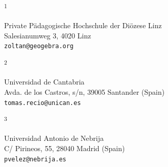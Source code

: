 \documentclass{article}
\newcommand{\ADDRESS}[2]{\noindent
  \textsuperscript{#1}\parbox[t]{0.9\textwidth}{#2} \vspace{6pt}}
\begin{document}
\vspace{1cm}

\ADDRESS{1}{
Private P\"adagogische Hochschule der Di\"ozese Linz \\
Salesianumweg 3, 4020 Linz \\
\texttt{zoltan@geogebra.org}
}

\vspace{.5cm}

\ADDRESS{2}{
Universidad de Cantabria \\
Avda. de los Castros, s/n, 39005 Santander (Spain) \\
\texttt{tomas.recio@unican.es}
}
\vspace{.5cm}

\ADDRESS{3}{
Universidad Antonio de Nebrija \\
C/ Pirineos, 55, 28040 Madrid (Spain) \\
\texttt{pvelez@nebrija.es}
}
\end{document}
